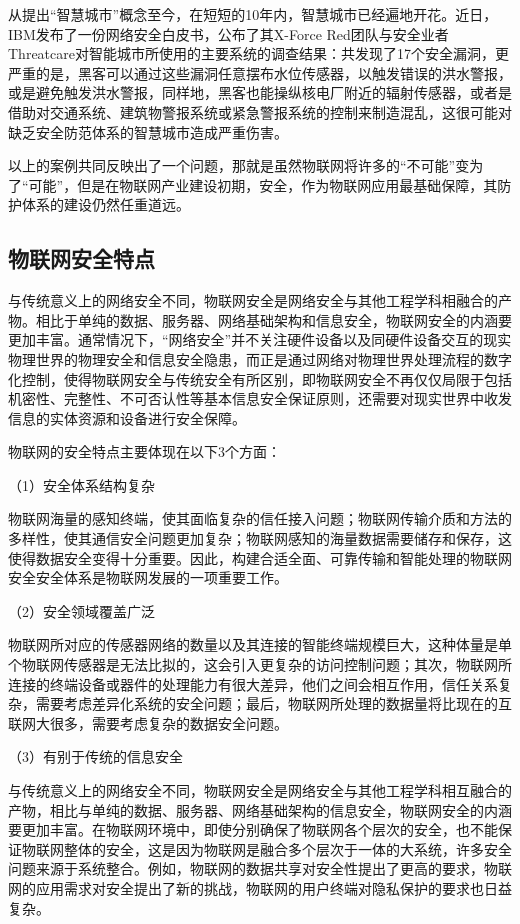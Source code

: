 从提出“智慧城市”概念至今，在短短的10年内，智慧城市已经遍地开花。近日，IBM发布了一份网络安全白皮书，公布了其X-Force Red团队与安全业者Threatcare对智能城市所使用的主要系统的调查结果：共发现了17个安全漏洞，更严重的是，黑客可以通过这些漏洞任意摆布水位传感器，以触发错误的洪水警报，或是避免触发洪水警报，同样地，黑客也能操纵核电厂附近的辐射传感器，或者是借助对交通系统、建筑物警报系统或紧急警报系统的控制来制造混乱，这很可能对缺乏安全防范体系的智慧城市造成严重伤害。

以上的案例共同反映出了一个问题，那就是虽然物联网将许多的“不可能”变为了“可能”，但是在物联网产业建设初期，安全，作为物联网应用最基础保障，其防护体系的建设仍然任重道远。


\subsection{物联网安全特点}
\label{computer}

与传统意义上的网络安全不同，物联网安全是网络安全与其他工程学科相融合的产物。相比于单纯的数据、服务器、网络基础架构和信息安全，物联网安全的内涵要更加丰富。通常情况下，“网络安全”并不关注硬件设备以及同硬件设备交互的现实物理世界的物理安全和信息安全隐患，而正是通过网络对物理世界处理流程的数字化控制，使得物联网安全与传统安全有所区别，即物联网安全不再仅仅局限于包括机密性、完整性、不可否认性等基本信息安全保证原则，还需要对现实世界中收发信息的实体资源和设备进行安全保障。

物联网的安全特点主要体现在以下3个方面：

（1）安全体系结构复杂

物联网海量的感知终端，使其面临复杂的信任接入问题；物联网传输介质和方法的多样性，使其通信安全问题更加复杂；物联网感知的海量数据需要储存和保存，这使得数据安全变得十分重要。因此，构建合适全面、可靠传输和智能处理的物联网安全安全体系是物联网发展的一项重要工作。

（2）安全领域覆盖广泛

物联网所对应的传感器网络的数量以及其连接的智能终端规模巨大，这种体量是单个物联网传感器是无法比拟的，这会引入更复杂的访问控制问题；其次，物联网所连接的终端设备或器件的处理能力有很大差异，他们之间会相互作用，信任关系复杂，需要考虑差异化系统的安全问题；最后，物联网所处理的数据量将比现在的互联网大很多，需要考虑复杂的数据安全问题。

（3）有别于传统的信息安全

与传统意义上的网络安全不同，物联网安全是网络安全与其他工程学科相互融合的产物，相比与单纯的数据、服务器、网络基础架构的信息安全，物联网安全的内涵要更加丰富。在物联网环境中，即使分别确保了物联网各个层次的安全，也不能保证物联网整体的安全，这是因为物联网是融合多个层次于一体的大系统，许多安全问题来源于系统整合。例如，物联网的数据共享对安全性提出了更高的要求，物联网的应用需求对安全提出了新的挑战，物联网的用户终端对隐私保护的要求也日益复杂。

